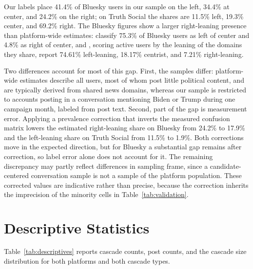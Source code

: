 \documentclass[letterpaper]{article} %
\newcommand{\rev}[1]{{\color{blue}#1}}
\begin{document}
\rev{Our labels place 41.4\% of Bluesky users in our sample on the left, 34.4\% at center, and 24.2\% on the right; on Truth Social the shares are 11.5\% left, 19.3\% center, and 69.2\% right. The Bluesky figures show a larger right-leaning presence than platform-wide estimates: \citet{quelle_bluesky_2024} classify 75.3\% of Bluesky users as left of center and 4.8\% as right of center, and \citet{nogara_bluesky_2026}, scoring active users by the leaning of the domains they share, report 74.61\% left-leaning, 18.17\% centrist, and 7.21\% right-leaning.}

\rev{Two differences account for most of this gap. First, the samples differ: platform-wide estimates describe all users, most of whom post little political content, and are typically derived from shared news domains, whereas our sample is restricted to accounts posting in a conversation mentioning Biden or Trump during one campaign month, labeled from post text. Second, part of the gap is measurement error. Applying a prevalence correction that inverts the measured confusion matrix lowers the estimated right-leaning share on Bluesky from 24.2\% to 17.9\% and the left-leaning share on Truth Social from 11.5\% to 1.9\%. Both corrections move in the expected direction, but for Bluesky a substantial gap remains after correction, so label error alone does not account for it. The remaining discrepancy may partly reflect differences in sampling frame, since a candidate-centered conversation sample is not a sample of the platform population. These corrected values are indicative rather than precise, because the correction inherits the imprecision of the minority cells in Table~\ref{tab:validation}.}

\section{\rev{Descriptive Statistics}}

\rev{Table~\ref{tab:descriptives} reports cascade counts, post counts, and the cascade size distribution for both platforms and both cascade types.}
\end{document}

